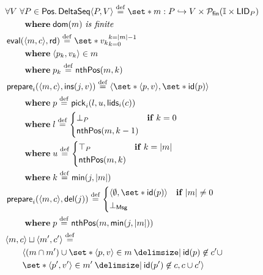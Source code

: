 \begin{align*}
&\begin{aligned}
\MoveEqLeft\forall V\ \forall P \in \trm{Pos} \qsep \trm{DeltaSeq}\tuple*{P, V} \defeq \set*{m: P \pto V} \times \powerfset{\mathbb{I} \times \trm{LID}_P}\\
&\where \trm{dom}(m)\ \textit{is finite}
\end{aligned}\\
%
&\begin{aligned}
\MoveEqLeft \trm{eval}(\tuple*{m, c}, \trm{rd}) \defeq \set*{v_k}_{k=0}^{k=\card*{m} - 1}\\
& \where \tuple*{p_k, v_k} \in m\\
& \where p_k \defeq \trm{nthPos}(m, k)
\end{aligned}\\
%
&\begin{aligned}
\MoveEqLeft \trm{prepare}_i(\tuple*{m,c}, \trm{ins}(j, v)) \defeq%
\tuple*{\set*{\tuple*{p, v}}, \set*{\trm{id}(p)}}\\
&\where p \defeq \trm{pick}_i(l, u, \trm{lids}_i(c))\\
&\where l \defeq \begin{dcases}
  \bot_P & \when k = 0\\
  \trm{nthPos}(m, k - 1) &
\end{dcases}\\
&\where u \defeq \begin{dcases}
  \top_P & \when k = \card*{m}\\
  \trm{nthPos}(m, k) &
\end{dcases}\\
&\where k \defeq \trm{min}(j, \card*{m})
\end{aligned}\\
%
&\begin{aligned}
\MoveEqLeft \trm{prepare}_i(\tuple*{m,c}, \trm{del}(j)) \defeq%
\begin{dcases}
    \tuple*{\emptyset,\set*{\trm{id}(p)}} & \when \card*{m} \neq 0\\
    \bot_{\trm{Msg}} &
\end{dcases}\\
&\where p \defeq \trm{nthPos}(m, \trm{min}(j, \card*{m}))
\end{aligned}\\
%
&\begin{aligned}
\MoveEqLeft \tuple*{m,c} \sqcup \tuple*{m',c'} \defeq\\
&\langle(m \cap m') \cup%
\set*{\tuple*{p, v} \in m \given \trm{id}(p) \not\in c'} \cup\\
&\set*{\tuple*{p', v'} \in m' \given \trm{id}(p') \not\in c}%
, c \cup c' \rangle
\end{aligned}
\end{align*}

